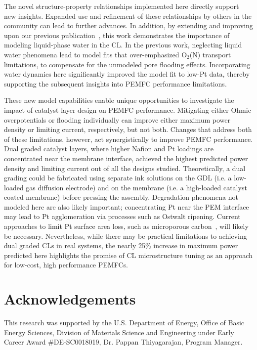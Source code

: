 \documentclass[final,3p,times,twocolumn]{elsarticle}    %
\begin{document}
The novel structure-property relationships implemented here directly support new insights. Expanded use and refinement of these relationships by others in the community can lead to further advances. In addition, by extending and improving upon our previous publication~\cite{bib:randall_2020}, this work demonstrates the importance of modeling liquid-phase water in the CL. In the previous work, neglecting liquid water phenomena lead to model fits that over-emphasized O$_{2}$(N) transport limitations, to compensate for the unmodeled pore flooding effects. Incorporating water dynamics here significantly improved the model fit to low-Pt data, thereby supporting the subsequent insights into PEMFC performance limitations.

These new model capabilities enable unique opportunities to investigate the impact of catalyst layer design on PEMFC performance. Mitigating either Ohmic overpotentials or flooding individually can improve either maximum power density or limiting current, respectively, but not both. Changes that address both of these limitations, however, act synergistically to improve PEMFC performance. Dual graded catalyst layers, where higher Nafion and Pt loadings are concentrated near the membrane interface, achieved the highest predicted power density and limiting current out of all the designs studied. Theoretically, a dual grading could be fabricated using separate ink solutions on the GDL (i.e. a low-loaded gas diffusion electrode) and on the membrane (i.e. a high-loaded catalyst coated membrane) before pressing the assembly. Degradation phenomena not modeled here are also likely important; concentrating Pt near the PEM interface may lead to Pt agglomeration via processes such as Ostwalt ripening. Current approaches to limit Pt surface area loss, such as microporous carbon~\cite{bib:padgett_2019, bib:ko_2021}, will likely be necessary. Nevertheless, while there may be practical limitations to achieving dual graded CLs in real systems, the nearly 25\% increase in maximum power predicted here highlights the promise of CL microstructure tuning as an approach for low-cost, high performance PEMFCs.


\section{Acknowledgements}
This research was supported by the U.S. Department of Energy, Office of Basic Energy Sciences, Division of Materials Science and Engineering under Early Career Award \#DE-SC0018019, Dr. Pappan Thiyagarajan, Program Manager.
\end{document}
